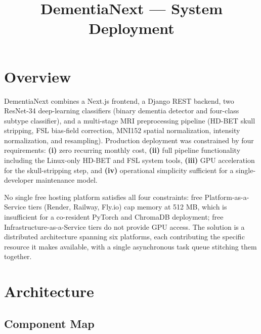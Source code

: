 \documentclass[11pt, a4paper]{article}
\title{\vspace{-2.0cm}\textbf{DementiaNext --- System Deployment}}
\author{}
\date{}
\begin{document}
\maketitle
\vspace{-1.4cm}

\section{Overview}

DementiaNext combines a Next.js frontend, a Django REST backend, two ResNet-34 deep-learning classifiers (binary dementia detector and four-class subtype classifier), and a multi-stage MRI preprocessing pipeline (HD-BET skull stripping, FSL bias-field correction, MNI152 spatial normalization, intensity normalization, and resampling). Production deployment was constrained by four requirements: \textbf{(i)} zero recurring monthly cost, \textbf{(ii)} full pipeline functionality including the Linux-only HD-BET and FSL system tools, \textbf{(iii)} GPU acceleration for the skull-stripping step, and \textbf{(iv)} operational simplicity sufficient for a single-developer maintenance model.

No single free hosting platform satisfies all four constraints: free Platform-as-a-Service tiers (Render, Railway, Fly.io) cap memory at 512 MB, which is insufficient for a co-resident PyTorch and ChromaDB deployment; free Infrastructure-as-a-Service tiers do not provide GPU access. The solution is a distributed architecture spanning six platforms, each contributing the specific resource it makes available, with a single asynchronous task queue stitching them together.

\section{Architecture}

\subsection{Component Map}
\end{document}
